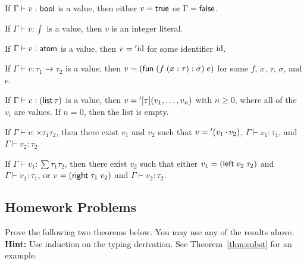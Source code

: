 \documentclass{homework}
\begin{document}
\begin{lem}
  \label{lem:bool-inv}
  If $\Gamma \vdash v : \bool$ is a value, then either $v = \true$ or $\Gamma = \false$.
\end{lem}
\begin{lem}
  \label{lem:int-inv}
  If $\Gamma \vdash v : \int$ is a value, then $v$ is an integer literal.
\end{lem}
\begin{lem}
  \label{lem:atomic-inv}
  If $\Gamma \vdash v : \atom$ is a value, then $v = \atomic{\id}$ for some identifier $\id$. 
\end{lem}\begin{lem}
  \label{lem:fun-inv}
  If $\Gamma \vdash v : \tau_1 \to \tau_2$ is a value, then $v = \lam{f}{x : \tau}{\sigma}{e}$ for some $f$, $x$, $\tau$, $\sigma$, and $e$.
\end{lem}
\begin{lem}
  \label{lem:list-inv}
  If $\Gamma \vdash v : \lstty{\tau}$ is a value, then $v = \lst{\tau}{v_1, \ldots, v_n}$ with $n \geq 0$, where all of the $v_i$ are values.
  If $n = 0$, then the list is empty.
\end{lem}
\begin{lem}
  \label{lem:times-inv}
  If $\Gamma \vdash v : \times{\tau_1}{\tau_2}$, then there exist $v_1$ and $v_2$ such that $v = \pr{v_1}{v_2}$,
  $\Gamma \vdash v_1 : \tau_1$, and $\Gamma \vdash v_2 : \tau_2$.
\end{lem}
\begin{lem}
  \label{lem:either-inv}
  If $\Gamma \vdash v_1 : \sum{\tau_1}{\tau_2}$, then there exist $v_2$ such that either $v_1 = \inl{v_2}{\tau_2}$ and $\Gamma \vdash v_1 : \tau_1$,
  or $v = \inr{v_2}{\tau_1}$ and $\Gamma \vdash v_2 : \tau_2$.
\end{lem}

\subsection{Homework Problems}

Prove the following two theorems below.
You may use any of the results above.\\
\textbf{Hint:} Use induction on the typing derivation.
See Theorem~\ref{thm:subst} for an example.
\end{document}
